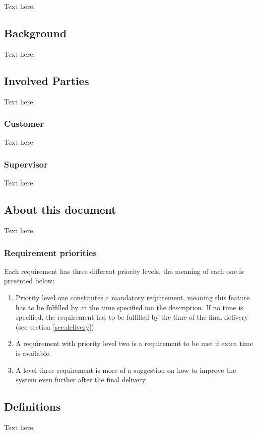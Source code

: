 Text here.

\subsection{Background}
Text here.

\subsection{Involved Parties}
Text here.

\subsubsection{Customer}
Text here

\subsubsection{Supervisor}
Text here

\subsection{About this document}
Text here.

\reqtable
{
	
}
\subsubsection{Requirement priorities}
Each requirement has three different priority levels, the meaning of each one is presented below:

\begin{enumerate}
	\item Priority level one constitutes a mandatory requirement, meaning this feature has to be fulfilled by at the time specified ion the description. If no time is specified, the requirement has to be fulfilled by the time of the final delivery (see section \ref{sec:delivery}). %
	\item A requirement with priority level two is a requirement to be met if extra time is available.
	\item A level three requirement is more of a suggestion on how to improve the system even further after the final delivery.
\end{enumerate}


\subsection{Definitions}
Text here.

